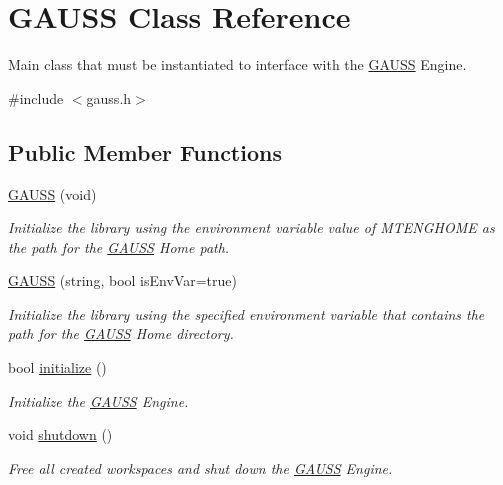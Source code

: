 \hypertarget{class_g_a_u_s_s}{\section{G\-A\-U\-S\-S Class Reference}
\label{class_g_a_u_s_s}
}


Main class that must be instantiated to interface with the \hyperlink{class_g_a_u_s_s}{G\-A\-U\-S\-S} Engine.  




{\ttfamily \#include $<$gauss.\-h$>$}

\subsection*{Public Member Functions}
\begin{DoxyCompactItemize}
\item 
\hyperlink{class_g_a_u_s_s_aba6a26957e7dbcd8f6357d1ca6ff4b90}{G\-A\-U\-S\-S} (void)
\begin{DoxyCompactList}\small\item\em Initialize the library using the environment variable value of {\ttfamily M\-T\-E\-N\-G\-H\-O\-M\-E} as the path for the \hyperlink{class_g_a_u_s_s}{G\-A\-U\-S\-S} Home path. \end{DoxyCompactList}\item 
\hyperlink{class_g_a_u_s_s_afd3a4f159bc887697d0dc6f1781714ae}{G\-A\-U\-S\-S} (string, bool is\-Env\-Var=true)
\begin{DoxyCompactList}\small\item\em Initialize the library using the specified environment variable that contains the path for the \hyperlink{class_g_a_u_s_s}{G\-A\-U\-S\-S} Home directory. \end{DoxyCompactList}\item 
bool \hyperlink{class_g_a_u_s_s_aad9f7a3a527b9c5961d1cc1b1aa9066c}{initialize} ()
\begin{DoxyCompactList}\small\item\em Initialize the \hyperlink{class_g_a_u_s_s}{G\-A\-U\-S\-S} Engine. \end{DoxyCompactList}\item 
void \hyperlink{class_g_a_u_s_s_a71721c595c12c94616ef414879c95460}{shutdown} ()
\begin{DoxyCompactList}\small\item\em Free all created workspaces and shut down the \hyperlink{class_g_a_u_s_s}{G\-A\-U\-S\-S} Engine. \end{DoxyCompactList}\item 

\end{DoxyCompactItemize}
